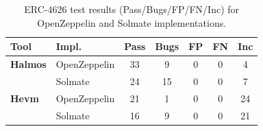 \begin{table}[htb]
\centering
\begin{scriptsize}
\begin{tabular}{llccccc}
\toprule
\textbf{Tool} & \textbf{Impl.} & \textbf{Pass} & \textbf{Bugs} & \textbf{FP} & \textbf{FN} & \textbf{Inc} \\
\midrule
\textbf{Halmos} & OpenZeppelin & 33 & 9 & 0 & 0 & 4 \\
 & Solmate & 24 & 15 & 0 & 0 & 7 \\
\textbf{Hevm} & OpenZeppelin & 21 & 1 & 0 & 0 & 24 \\
 & Solmate & 16 & 9 & 0 & 0 & 21 \\
\bottomrule
\end{tabular}
\end{scriptsize}
\caption{ERC-4626 test results (Pass/Bugs/FP/FN/Inc) for OpenZeppelin and Solmate implementations.}
\label{tab:test_results_erc4626}
\end{table}
